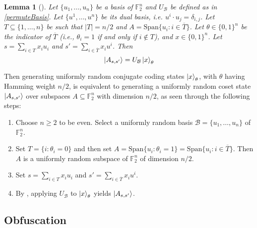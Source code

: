\documentclass[12pt,letterpaper]{article}
\newtheorem{lem}[theorem]{Lemma}
\theoremstyle{definition}
\theoremstyle{remark}
\begin{document}
\begin{lem}[\cite{CV21arxiv}]
\label{cosetBB84equivalence}
    Let $\{u_1, \ldots, u_n\}$ be a basis of $\mathbb{F}^n_2$ and $U_\mathcal{B}$ be defined as in \cref{permuteBasis}. Let $\{u^1, \ldots, u^n\}$ be its dual basis, \emph{i.e.} $u^i\cdot u_j = \delta_{i,j}$. Let $T \subseteq \{1,\ldots,n\}$ be such that $|T|=n/2$ and $A=\text{Span}\{u_i : i\in \overline{T}\}$. Let $\theta \in \{0,1\}^n$ be the indicator of $\overline{T}$ (\emph{i.e.}, $\theta_i=1$ if and only if $i \notin T$), and $x \in \{0,1\}^n$. Let $s=\sum_{i\in T} x_iu_i$ and $s'=\sum_{i \in \overline{T}}x_iu^i$. Then
    \begin{equation}
        \ket{A_{s,s'}} = U_\mathcal{B} \ket{x}_\theta
    \end{equation}
\end{lem}

Then generating uniformly random conjugate coding states $\ket{x}_\theta$, with $\theta$ having Hamming weight $n/2$, is equivalent to generating a uniformly random coset state $\ket{A_{s,s'}}$ over subspaces $A \subseteq \mathbb{F}^n_2$ with dimension $n/2$, as seen through the following steps:
\begin{enumerate}
    \item Choose $n\geq 2$ to be even. Select a uniformly random basis $\mathcal{B}=\{u_1, \ldots, u_n\}$ of $\mathbb{F}^n_2$.
    \item Set $T = \{i: \theta_i = 0\}$ and then set $A=\text{Span}\{u_i: \theta_i=1\}=\text{Span}\{u_i: i \in \overline{T}\}$. Then $A$ is a uniformly random subspace of $\mathbb{F}^n_2$ of dimension $n/2$. \label{generateSubspace}
    \item Set $s=\sum_{i\in T} x_iu_i$ and $s'=\sum_{i\in \overline{T}}x_iu^i$. \label{generateParameters}
    \item By , applying $U_{\mathcal{B}}$ to $\ket{x}_\theta$ yields $\ket{A_{s,s'}}$.
\end{enumerate}


\subsection{Obfuscation}
\end{document}
